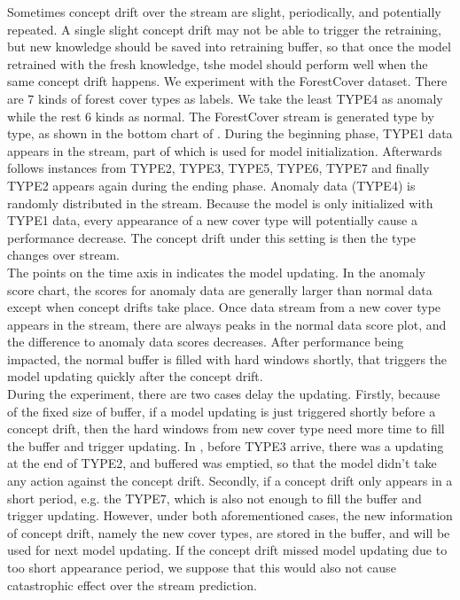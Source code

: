 Sometimes concept drift over the stream are slight, periodically, and potentially repeated. A single slight concept drift may not be able to trigger the retraining, but new knowledge should be saved into retraining buffer, so that once the model retrained with the fresh knowledge, tshe model should perform well when the same concept drift happens. We experiment with the ForestCover dataset. There are 7 kinds of forest cover types as labels. We take the least TYPE4 as anomaly while the rest 6 kinds as normal. The ForestCover stream is generated type by type, as shown in the bottom chart of . During the beginning phase, TYPE1 data appears in the stream, part of which is used for model initialization. Afterwards follows instances from TYPE2, TYPE3, TYPE5, TYPE6, TYPE7 and finally TYPE2 appears again during the ending phase. Anomaly data (TYPE4) is randomly distributed in the stream. Because the model is only initialized with TYPE1 data, every appearance of a new cover type will potentially cause a performance decrease. The concept drift under this setting is then the type changes over stream. \\

The points on the time axis in  indicates the model updating. In the anomaly score chart, the scores for anomaly data are generally larger than normal data except when concept drifts take place. Once data stream from a new cover type appears in the stream, there are always peaks in the normal data score plot, and the difference to anomaly data scores decreases. After performance being impacted, the normal buffer is filled with hard windows shortly, that triggers the model updating quickly after the concept drift. \\

During the experiment, there are two cases delay the updating. Firstly, because of the fixed size of buffer, if a model updating is just triggered shortly before a concept drift, then the hard windows from new cover type need more time to fill the buffer and trigger updating. In , before TYPE3 arrive, there was a updating at the end of TYPE2, and buffered was emptied, so that the model didn’t take any action against the concept drift. Secondly, if a concept drift only appears in a short period, e.g. the TYPE7, which is also not enough to fill the buffer and trigger updating. However, under both aforementioned cases, the new information of concept drift, namely the new cover types, are stored in the buffer, and will be used for next model updating. If the concept drift missed model updating due to too short appearance period, we suppose that this would also not cause catastrophic effect over the stream prediction.\\

